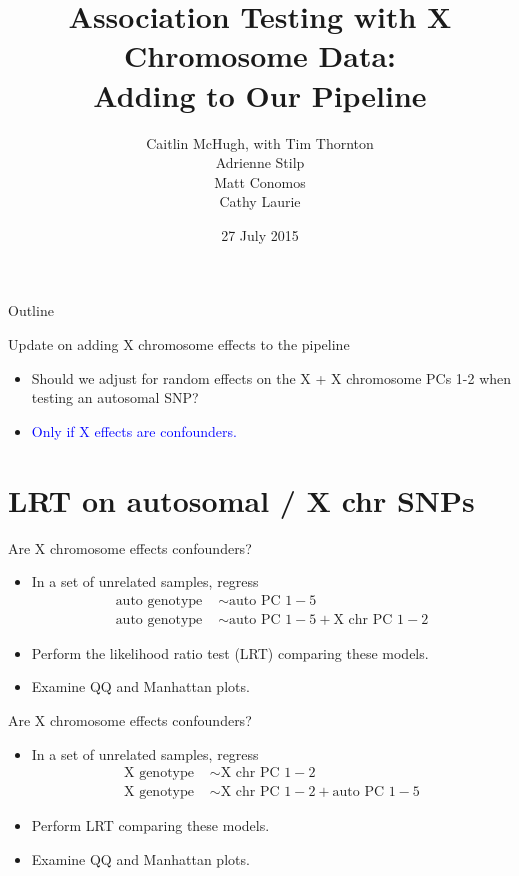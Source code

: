 \documentclass{beamer}
\title[Association Testing with X Chromosome Data] %
{Association Testing with X Chromosome Data:\\
Adding to Our Pipeline}
\author[Caitlin McHugh, with Tim Thornton\\Adrienne Stilp\\Matt Conomos\\Cathy Laurie] %
{Caitlin McHugh, with Tim Thornton\\Adrienne Stilp\\Matt Conomos\\Cathy Laurie}
\institute[University of Washington] %
{
  Department of Biostatistics\\
  University of Washington
}
\date[Short Occasion] %
{27 July 2015}
\begin{document}
\begin{frame}
  \titlepage
\end{frame}

\begin{frame}{Outline}
 \tableofcontents
\end{frame}


\begin{frame}{Update on adding X chromosome effects to the pipeline}
\begin{itemize}
\item Should we adjust for random effects on the X + X chromosome PCs 1-2 when testing an autosomal SNP?
\item \textcolor{blue}{Only if X effects are confounders.}
\end{itemize}
\end{frame}

\section[]{LRT on autosomal / X chr SNPs}
\begin{frame}{Are X chromosome effects confounders?}
\begin{itemize}
\item In a set of unrelated samples, regress 
\begin{align*}
\mbox{auto genotype }&\sim \mbox{auto PC }1-5\\
\mbox{auto genotype }&\sim \mbox{auto PC }1-5 + \mbox{X chr PC }1-2
\end{align*}
\item Perform the likelihood ratio test (LRT) comparing these models.
\item Examine QQ and Manhattan plots.
\end{itemize}
\end{frame}

\begin{frame}{Are X chromosome effects confounders?}
\begin{itemize}
\item In a set of unrelated samples, regress 
\begin{align*}
\mbox{X genotype }&\sim \mbox{X chr PC }1-2\\
\mbox{X genotype }&\sim \mbox{X chr PC }1-2 + \mbox{auto PC }1-5
\end{align*}
\item Perform LRT comparing these models.
\item Examine QQ and Manhattan plots.
\end{itemize}
\end{frame}
\end{document}
